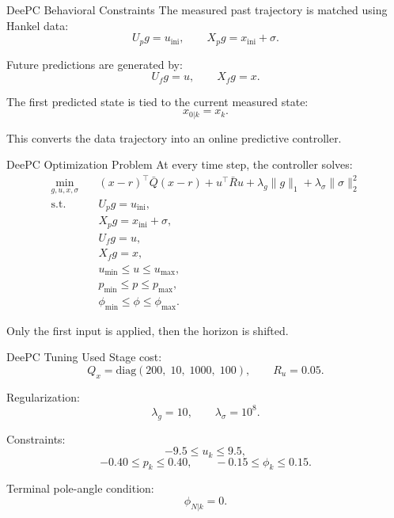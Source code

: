 \documentclass[aspectratio=169,11pt]{beamer}
\begin{document}
\begin{frame}{DeePC Behavioral Constraints}
    The measured past trajectory is matched using Hankel data:
    \[
    U_p g = u_{\mathrm{ini}},
    \qquad
    X_p g = x_{\mathrm{ini}}+\sigma.
    \]

    Future predictions are generated by:
    \[
    U_f g = u,
    \qquad
    X_f g = x.
    \]

    The first predicted state is tied to the current measured state:
    \[
    x_{0|k}=x_k.
    \]

    \vspace{0.3cm}
    This converts the data trajectory into an online predictive controller.
\end{frame}

\begin{frame}{DeePC Optimization Problem}
    At every time step, the controller solves:
    \[
    \begin{aligned}
    \min_{g,u,x,\sigma}\quad
    &(x-r)^{\top}\bar{Q}(x-r)
    +u^{\top}\bar{R}u
    +\lambda_g\|g\|_1
    +\lambda_{\sigma}\|\sigma\|_2^2\\
    \mathrm{s.t.}\quad
    &U_p g = u_{\mathrm{ini}},\\
    &X_p g = x_{\mathrm{ini}}+\sigma,\\
    &U_f g = u,\\
    &X_f g = x,\\
    &u_{\min}\leq u \leq u_{\max},\\
    &p_{\min}\leq p \leq p_{\max},\\
    &\phi_{\min}\leq \phi \leq \phi_{\max}.
    \end{aligned}
    \]

    \vspace{0.2cm}
    Only the first input is applied, then the horizon is shifted.
\end{frame}

\begin{frame}{DeePC Tuning Used}
    Stage cost:
    \[
    Q_x=\mathrm{diag}(200,\;10,\;1000,\;100),\qquad R_u=0.05.
    \]

    Regularization:
    \[
    \lambda_g=10,\qquad \lambda_{\sigma}=10^8.
    \]

    Constraints:
    \[
    -9.5 \leq u_k \leq 9.5,
    \]
    \[
    -0.40 \leq p_k \leq 0.40,
    \qquad
    -0.15 \leq \phi_k \leq 0.15.
    \]

    Terminal pole-angle condition:
    \[
    \phi_{N|k}=0.
    \]
\end{frame}
\end{document}
